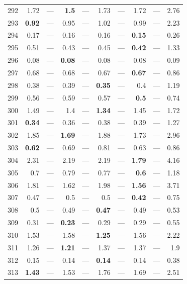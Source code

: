 \begin{longtable}{lr@{\hskip 4pt}l@{\hskip 12pt}r@{\hskip 4pt}l@{\hskip 12pt}r@{\hskip 4pt}l@{\hskip 12pt}r@{\hskip 4pt}l@{\hskip 12pt}r}
292 & 1.72 & --- & \textbf{1.5} & --- & 1.73 & --- & 1.72 & --- & 2.76 \\
293 & \textbf{0.92} & --- & 0.95 & --- & 1.02 & --- & 0.99 & --- & 2.23 \\
294 & 0.17 & --- & 0.16 & --- & 0.16 & --- & \textbf{0.15} & --- & 0.26 \\
295 & 0.51 & --- & 0.43 & --- & 0.45 & --- & \textbf{0.42} & --- & 1.33 \\
296 & 0.08 & --- & \textbf{0.08} & --- & 0.08 & --- & 0.08 & --- & 0.09 \\
297 & 0.68 & --- & 0.68 & --- & 0.67 & --- & \textbf{0.67} & --- & 0.86 \\
298 & 0.38 & --- & 0.39 & --- & \textbf{0.35} & --- & 0.4 & --- & 1.19 \\
299 & 0.56 & --- & 0.59 & --- & 0.57 & --- & \textbf{0.5} & --- & 0.74 \\
300 & 1.49 & --- & 1.4 & --- & \textbf{1.34} & --- & 1.45 & --- & 1.72 \\
301 & \textbf{0.34} & --- & 0.36 & --- & 0.38 & --- & 0.39 & --- & 1.27 \\
302 & 1.85 & --- & \textbf{1.69} & --- & 1.88 & --- & 1.73 & --- & 2.96 \\
303 & \textbf{0.62} & --- & 0.69 & --- & 0.81 & --- & 0.63 & --- & 0.86 \\
304 & 2.31 & --- & 2.19 & --- & 2.19 & --- & \textbf{1.79} & --- & 4.16 \\
305 & 0.7 & --- & 0.79 & --- & 0.77 & --- & \textbf{0.6} & --- & 1.18 \\
306 & 1.81 & --- & 1.62 & --- & 1.98 & --- & \textbf{1.56} & --- & 3.71 \\
307 & 0.47 & --- & 0.5 & --- & 0.5 & --- & \textbf{0.42} & --- & 0.75 \\
308 & 0.5 & --- & 0.49 & --- & \textbf{0.47} & --- & 0.49 & --- & 0.53 \\
309 & 0.31 & --- & \textbf{0.23} & --- & 0.29 & --- & 0.29 & --- & 0.55 \\
310 & 1.53 & --- & 1.58 & --- & \textbf{1.25} & --- & 1.56 & --- & 2.22 \\
311 & 1.26 & --- & \textbf{1.21} & --- & 1.37 & --- & 1.37 & --- & 1.9 \\
312 & 0.15 & --- & 0.14 & --- & \textbf{0.14} & --- & 0.14 & --- & 0.38 \\
313 & \textbf{1.43} & --- & 1.53 & --- & 1.76 & --- & 1.69 & --- & 2.51 \\
\bottomrule
\end{longtable}